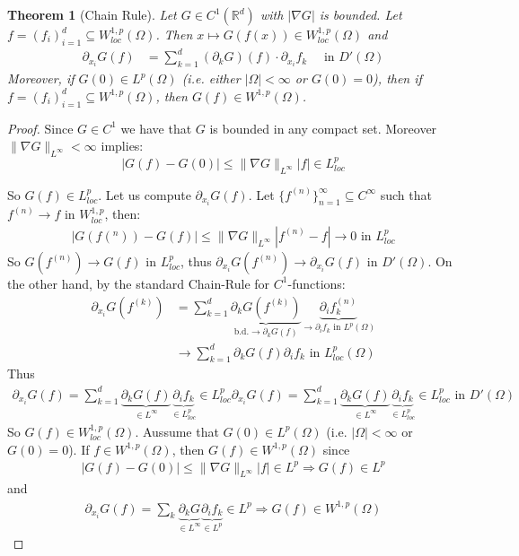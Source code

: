 \documentclass{report}
\theoremstyle{tommy}
\newtheorem{thm}[defn]{Theorem}
\begin{document}
  
  \begin{thm}[Chain Rule]
    Let \(G \in C^1(\mathbb{R}^d)\) with \(|\nabla G|\) is bounded. Let \(f = (f_i)_{i=1}^d \subseteq W_{loc}^{1,p}(\Omega)\). Then \(x \mapsto G(f(x)) \in W_{loc}^{1,p}(\Omega)\) and
    \begin{align*}
      \partial_{x_i} G(f)
      &= \sum_{k=1}^d (\partial_k G)(f) \cdot \partial_{x_i} f_k \quad \text{ in } D'(\Omega)
    \end{align*}
    Moreover, if \(G(0) \in L^p(\Omega)\) (i.e. either \(|\Omega| < \infty\) or \(G(0) = 0\)), then if \(f = (f_i)_{i=1}^d \subseteq W^{1,p}(\Omega)\), then \(G(f) \in W^{1,p}(\Omega)\).
  \end{thm}

  \begin{proof}
    Since \(G \in C^1\) we have that \(G\) is bounded in any compact set. Moreover \(\|\nabla G\|_{L^\infty} < \infty\) implies:
    \[|G(f) - G(0)| \le \|\nabla G\|_{L^\infty} |f| \in L^p_{loc}\]
  
    So \(G(f) \in L_{loc}^p\). Let us compute \(\partial_{x_i} G(f)\). Let \(\{f^{(n)}\}_{n=1}^\infty \subseteq C^\infty\) such that \(f^{(n)} \to f\) in \(W_{loc}^{1,p}\), then: 
    \begin{align*}
      |G(f(^n)) - G(f)|
      \le \|\nabla G\|_{L^\infty} |f^{(n)} - f| \to 0 \text{ in  \(L_{loc}^p\)}
    \end{align*}
    So \(G(f^{(n)}) \to G(f)\) in \(L_{loc}^p\), thus \(\partial_{x_i} G(f^{(n)}) \to \partial_{x_i} G(f)\) in \(D'(\Omega)\). On the other hand, by the standard Chain-Rule for \(C^1\)-functions:
    \begin{align*}
      \partial_{x_i} G(f^{(k)})
      &= \sum_{k=1}^d \underbrace{\partial_k G(f^{(k)})}_{\text{b.d.} \to \partial_k G(f)} \underbrace{\partial_i f_k^{(n)}}_{\to \partial_i f_k \text{ in } L^p(\Omega)} \\
      &\to \sum_{k=1}^d \partial_k G(f) \partial_i f_k \text{ in }L_{loc}^p(\Omega)
    \end{align*}
    Thus
    \begin{align*}
      \partial_{x_i} G(f) = \sum_{k=1}^d \underbrace{\partial_k G(f)}_{\in L^\infty} \underbrace{\partial_i f_k}_{\in L_{loc}^p} \in L_{loc}^p
      \partial_{x_i} G(f) = \sum_{k=1}^d \underbrace{\partial_k G(f)}_{\in L^\infty} \underbrace{\partial_i f_k}_{\in L_{loc}^p} \in L_{loc}^p \text{ in } D'(\Omega)
    \end{align*}
    So \(G(f) \in W_{loc}^{1,p}(\Omega)\). Aussume that \(G(0) \in L^p(\Omega)\) (i.e. \(|\Omega| < \infty\) or \(G(0) = 0\)). If \(f \in W^{1,p}(\Omega)\), then \(G(f) \in W^{1,p}(\Omega)\) since
    \begin{align*}
      |G(f) - G(0) | \le \|\nabla G\|_{L^\infty} |f| \in L^p \Rightarrow G(f) \in L^p
    \end{align*}
    and 
    \begin{align*}
      \partial_{x_i} G(f) = \sum_k \underbrace{\partial_k G}_{\in L^\infty} \underbrace{\partial_i f_k}_{\in L^p} \in L^p \Rightarrow G(f) \in W^{1,p}(\Omega)
    \end{align*}
  \end{proof}
\end{document}
